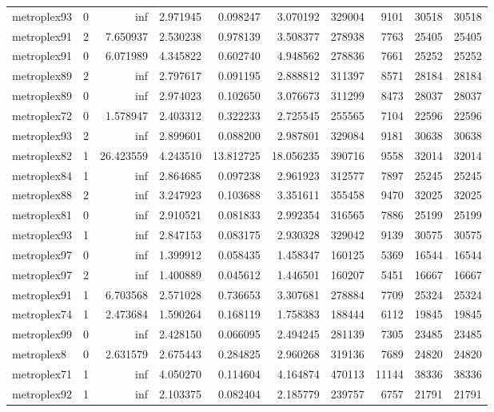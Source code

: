 \begin{longtable}{|l|r|r|r|r|r|r|r|r|r|}
metroplex93 & 0 & inf & 2.971945 & 0.098247 & 3.070192 & 329004 & 9101 & 30518 & 30518 \\
metroplex91 & 2 & 7.650937 & 2.530238 & 0.978139 & 3.508377 & 278938 & 7763 & 25405 & 25405 \\
metroplex91 & 0 & 6.071989 & 4.345822 & 0.602740 & 4.948562 & 278836 & 7661 & 25252 & 25252 \\
metroplex89 & 2 & inf & 2.797617 & 0.091195 & 2.888812 & 311397 & 8571 & 28184 & 28184 \\
metroplex89 & 0 & inf & 2.974023 & 0.102650 & 3.076673 & 311299 & 8473 & 28037 & 28037 \\
metroplex72 & 0 & 1.578947 & 2.403312 & 0.322233 & 2.725545 & 255565 & 7104 & 22596 & 22596 \\
metroplex93 & 2 & inf & 2.899601 & 0.088200 & 2.987801 & 329084 & 9181 & 30638 & 30638 \\
metroplex82 & 1 & 26.423559 & 4.243510 & 13.812725 & 18.056235 & 390716 & 9558 & 32014 & 32014 \\
metroplex84 & 1 & inf & 2.864685 & 0.097238 & 2.961923 & 312577 & 7897 & 25245 & 25245 \\
metroplex88 & 2 & inf & 3.247923 & 0.103688 & 3.351611 & 355458 & 9470 & 32025 & 32025 \\
metroplex81 & 0 & inf & 2.910521 & 0.081833 & 2.992354 & 316565 & 7886 & 25199 & 25199 \\
metroplex93 & 1 & inf & 2.847153 & 0.083175 & 2.930328 & 329042 & 9139 & 30575 & 30575 \\
metroplex97 & 0 & inf & 1.399912 & 0.058435 & 1.458347 & 160125 & 5369 & 16544 & 16544 \\
metroplex97 & 2 & inf & 1.400889 & 0.045612 & 1.446501 & 160207 & 5451 & 16667 & 16667 \\
metroplex91 & 1 & 6.703568 & 2.571028 & 0.736653 & 3.307681 & 278884 & 7709 & 25324 & 25324 \\
metroplex74 & 1 & 2.473684 & 1.590264 & 0.168119 & 1.758383 & 188444 & 6112 & 19845 & 19845 \\
metroplex99 & 0 & inf & 2.428150 & 0.066095 & 2.494245 & 281139 & 7305 & 23485 & 23485 \\
metroplex8 & 0 & 2.631579 & 2.675443 & 0.284825 & 2.960268 & 319136 & 7689 & 24820 & 24820 \\
metroplex71 & 1 & inf & 4.050270 & 0.114604 & 4.164874 & 470113 & 11144 & 38336 & 38336 \\
metroplex92 & 1 & inf & 2.103375 & 0.082404 & 2.185779 & 239757 & 6757 & 21791 & 21791 \\

\end{longtable}

